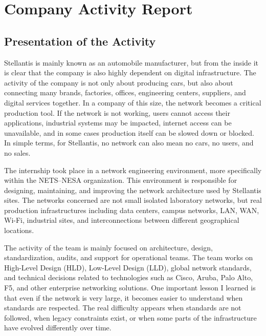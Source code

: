 \documentclass[11pt,a4paper]{report}
\begin{document}

\chapter{Company Activity Report}

\section{Presentation of the Activity}

Stellantis is mainly known as an automobile manufacturer, but from the inside it is clear that the company is also highly dependent on digital infrastructure. The activity of the company is not only about producing cars, but also about connecting many brands, factories, offices, engineering centers, suppliers, and digital services together. In a company of this size, the network becomes a critical production tool. If the network is not working, users cannot access their applications, industrial systems may be impacted, internet access can be unavailable, and in some cases production itself can be slowed down or blocked. In simple terms, for Stellantis, no network can also mean no cars, no users, and no sales.

The internship took place in a network engineering environment, more specifically within the NETS--NESA organization. This environment is responsible for designing, maintaining, and improving the network architecture used by Stellantis sites. The networks concerned are not small isolated laboratory networks, but real production infrastructures including data centers, campus networks, LAN, WAN, Wi-Fi, industrial sites, and interconnections between different geographical locations.

The activity of the team is mainly focused on architecture, design, standardization, audits, and support for operational teams. The team works on High-Level Design (HLD), Low-Level Design (LLD), global network standards, and technical decisions related to technologies such as Cisco, Aruba, Palo Alto, F5, and other enterprise networking solutions. One important lesson I learned is that even if the network is very large, it becomes easier to understand when standards are respected. The real difficulty appears when standards are not followed, when legacy constraints exist, or when some parts of the infrastructure have evolved differently over time.
\end{document}
